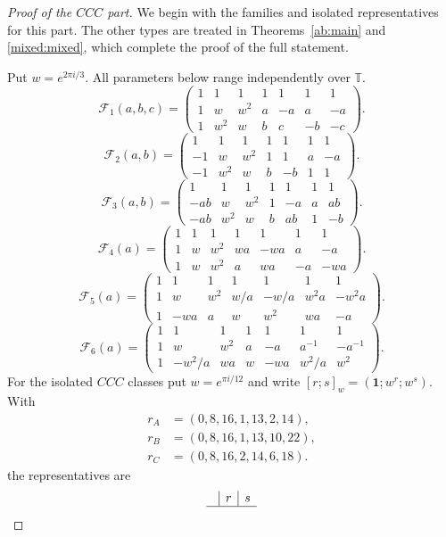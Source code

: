 \documentclass[11pt,a4paper]{article}
\theoremstyle{plain}
\theoremstyle{definition}
\numberwithin{equation}{section}
\begin{document}
\begin{proof}[Proof of the $CCC$ part]
We begin with the families and isolated representatives for this part. The other types are treated in Theorems~\ref{ab:main} and \ref{mixed:mixed}, which complete the proof of the full statement.

Put $w=e^{2\pi i/3}$. All parameters below range independently over $\mathbb T$.
$$
\mathcal F_1(a,b,c)=
\begin{pmatrix}1&1&1&1&1&1&1\\
1&w&w^2&a&-a&a&-a\\
    1&w^2&w&b&c&-b&-c\end{pmatrix}.
$$
$$
\mathcal F_2(a,b)=
\begin{pmatrix}1&1&1&1&1&1&1\\
-1&w&w^2&1&1&a&-a\\
    -1&w^2&w&b&-b&1&1\end{pmatrix}.
$$
$$
\mathcal F_3(a,b)=
\begin{pmatrix}1&1&1&1&1&1&1\\
-ab&w&w^2&1&-a&a&ab\\
    -ab&w^2&w&b&ab&1&-b\end{pmatrix}.
$$
$$
\mathcal F_4(a)=
\begin{pmatrix}1&1&1&1&1&1&1\\
1&w&w^2&wa&-wa&a&-a\\
    1&w&w^2&a&wa&-a&-wa\end{pmatrix}.
$$
$$
\mathcal F_5(a)=
\begin{pmatrix}1&1&1&1&1&1&1\\
1&w&w^2&w/a&-w/a&w^2a&-w^2a\\
    1&-wa&a&w&w^2&wa&-a\end{pmatrix}.
$$
$$
\mathcal F_6(a)=
\begin{pmatrix}1&1&1&1&1&1&1\\
1&w&w^2&a&-a&a^{-1}&-a^{-1}\\
    1&-w^2/a&wa&w&-wa&w^2/a&w^2\end{pmatrix}.
$$
\label{ccc:s:validity}
For the isolated $CCC$ classes put $w=e^{\pi i/12}$ and write $[r;s]_w=(\mathbf1;w^r;w^s)$. With
$$
\begin{aligned}
 r_A&=(0,8,16,1,13,2,14),\\
 r_B&=(0,8,16,1,13,10,22),\\
 r_C&=(0,8,16,2,14,6,18).
\end{aligned}
$$
the representatives are
$$
\begin{array}{c|c|rrrrrrr}
 &r&\multicolumn{7}{c}{s}\\ \hline

\end{array}$$
\end{proof}
\end{document}
